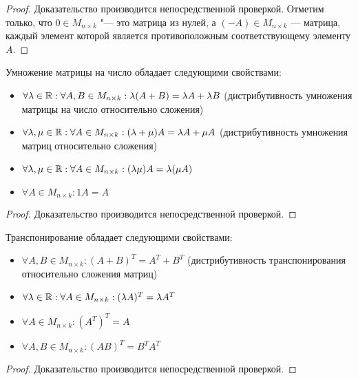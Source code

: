 \begin{proof}
	Доказательство производится непосредственной проверкой. Отметим только, что $0 \in M_{n \times k}$ "--- это матрица из нулей, а $(-A) \in M_{n \times k}$ --- матрица, каждый элемент которой является противоположным соответствующему элементу $A$.
\end{proof}

\begin{proposition}
	Умножение матрицы на число обладает следующими свойствами:
	
	\begin{itemize}
		\item $\forall \lambda \in \mathbb{R}: \forall A, B \in M_{n \times k}: \lambda(A + B) = \lambda A + \lambda B$ (дистрибутивность умножения матрицы на число относительно сложения)
		\item $\forall \lambda, \mu \in \mathbb{R}: \forall A \in M_{n \times k}: (\lambda + \mu)A = \lambda A + \mu A$ (дистрибутивность умножения матриц относительно сложения)
		\item $\forall \lambda, \mu \in \mathbb{R}: \forall A \in M_{n \times k}: (\lambda \mu)A = \lambda (\mu A)$
		\item $\forall A \in M_{n \times k}: 1A = A$
	\end{itemize}
\end{proposition}

\begin{proof}
	Доказательство производится непосредственной проверкой.
\end{proof}

\begin{proposition}
	Транспонирование обладает следующими свойствами:
	\begin{itemize}
		\item $\forall A, B \in M_{n \times k}: (A + B)^T = A^T + B^T$ (дистрибутивность транспонирования относительно сложения матриц)
		\item $\forall \lambda \in \mathbb{R}: \forall A \in M_{n \times k}: (\lambda A)^T = \lambda A^T$
		\item $\forall A \in M_{n \times k}: (A^T)^T = A$
		\item $\forall A, B \in M_{n \times k}: (AB)^T = B^T A^T$
	\end{itemize}
\end{proposition}

\begin{proof}
	Доказательство производится непосредственной проверкой.
\end{proof}

